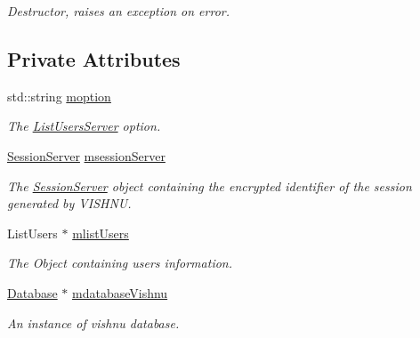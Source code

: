 \begin{DoxyCompactItemize}
\begin{DoxyCompactList}\small\item\em Destructor, raises an exception on error. \item\end{DoxyCompactList}\end{DoxyCompactItemize}
\subsection*{Private Attributes}
\begin{DoxyCompactItemize}
\item 
\hypertarget{classListUsersServer_aef28d9ca8db9ec7b8b90ce24a8c17f58}{
std::string \hyperlink{classListUsersServer_aef28d9ca8db9ec7b8b90ce24a8c17f58}{moption}}
\label{classListUsersServer_aef28d9ca8db9ec7b8b90ce24a8c17f58}

\begin{DoxyCompactList}\small\item\em The \hyperlink{classListUsersServer}{ListUsersServer} option. \item\end{DoxyCompactList}\item 
\hypertarget{classListUsersServer_a7f3daa6402f0f2f69bd2977250b48b87}{
\hyperlink{classSessionServer}{SessionServer} \hyperlink{classListUsersServer_a7f3daa6402f0f2f69bd2977250b48b87}{msessionServer}}
\label{classListUsersServer_a7f3daa6402f0f2f69bd2977250b48b87}

\begin{DoxyCompactList}\small\item\em The \hyperlink{classSessionServer}{SessionServer} object containing the encrypted identifier of the session generated by VISHNU. \item\end{DoxyCompactList}\item 
\hypertarget{classListUsersServer_ab507882abaf0368f193879d58903382b}{
ListUsers $\ast$ \hyperlink{classListUsersServer_ab507882abaf0368f193879d58903382b}{mlistUsers}}
\label{classListUsersServer_ab507882abaf0368f193879d58903382b}

\begin{DoxyCompactList}\small\item\em The Object containing users information. \item\end{DoxyCompactList}\item 
\hypertarget{classListUsersServer_aca827ba5f28c4f500d514f93ab474df0}{
\hyperlink{classDatabase}{Database} $\ast$ \hyperlink{classListUsersServer_aca827ba5f28c4f500d514f93ab474df0}{mdatabaseVishnu}}
\label{classListUsersServer_aca827ba5f28c4f500d514f93ab474df0}

\begin{DoxyCompactList}\small\item\em An instance of vishnu database. \item\end{DoxyCompactList}\end{DoxyCompactItemize}


